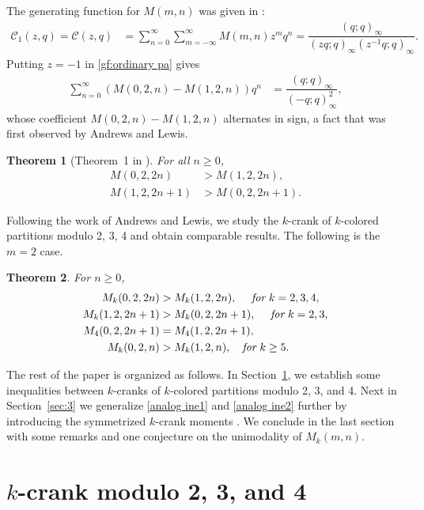 \documentclass[12pt]{amsart}
\numberwithin{equation}{section}
\theoremstyle{plain}
\newtheorem{theorem}{Theorem}[section]
\theoremstyle{definition}
\begin{document}
The generating function for $M(m,n)$ was given in \cite{A-G,Gar1}:
\begin{align}\label{gf:ordinary pa}
\mathcal{C}_1(z,q)=\mathcal{C}(z,q) &=\sum_{n=0}^{\infty}\sum_{m=-\infty}^{\infty}M(m,n)z^{m}q^{n}=\dfrac{(q;q)_{\infty}}{(zq;q)_{\infty}(z^{-1}q;q)_{\infty}}.
\end{align}
Putting $z=-1$ in \eqref{gf:ordinary pa} gives
\begin{align*}
\sum_{n=0}^{\infty}\left(M(0,2,n)-M(1,2,n)\right)q^{n} &=\dfrac{(q;q)_{\infty}}{(-q;q)_{\infty}^{2}},
\end{align*}
whose coefficient $M(0,2,n)-M(1,2,n)$ alternates in sign, a fact that was first observed by Andrews and Lewis.
\begin{theorem}[Theorem~1 in \cite{AL}]\label{parity results}
For all $n\geq0$,
\begin{align*}
M(0,2,2n) &>M(1,2,2n),\\
M(1,2,2n+1) &>M(0,2,2n+1).
\end{align*}
\end{theorem}

Following the work of Andrews and Lewis, we study the $k$-crank of $k$-colored partitions modulo 2, 3, 4 and obtain comparable results. The following is the $m=2$ case.
\begin{theorem}\label{thm:alternate thm}
For $n\geq0$,
\begin{align}
M_{k}(0,2,2n) &>M_{k}(1,2,2n),\quad~\emph{for}~k=2,3,4,\label{analog ine1}\\
M_{k}(1,2,2n+1) &>M_{k}(0,2,2n+1),\quad~\emph{for}~k=2,3,\label{analog ine2}\\
M_{4}(0,2,2n+1) &= M_{4}(1,2,2n+1), \label{strict iden1}\\
M_{k}(0,2,n) &> M_{k}(1,2,n), \quad \emph{for}~k\geq5.\label{analog ine3}
\end{align}
\end{theorem}


The rest of the paper is organized as follows. In Section~\ref{sec:2}, we establish some inequalities between $k$-cranks of $k$-colored partitions modulo 2, 3, and 4. Next in Section~\ref{sec:3} we generalize \eqref{analog ine1} and \eqref{analog ine2} further by introducing the symmetrized $k$-crank moments . We conclude in the last section with some remarks and one conjecture on the unimodality of $M_k(m,n)$.



\section{$k$-crank modulo 2, 3, and 4}\label{sec:2}
\end{document}

